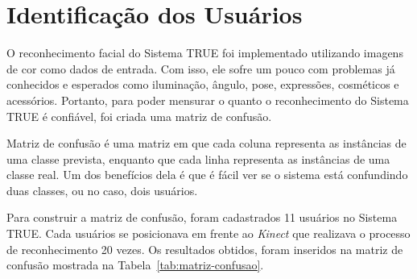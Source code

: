 \section{Identificação dos Usuários}
	 
	O reconhecimento facial do Sistema TRUE foi implementado utilizando imagens de cor como dados de entrada. Com isso, ele sofre um pouco com problemas já conhecidos e esperados como iluminação, ângulo, pose, expressões, cosméticos e acessórios. Portanto, para poder mensurar o quanto o reconhecimento do Sistema TRUE é confiável, foi criada uma matriz de confusão.

	Matriz de confusão é uma matriz em que cada coluna representa as instâncias de uma classe prevista, enquanto que cada linha representa as instâncias de uma classe real. Um dos benefícios dela é que é fácil ver se o sistema está confundindo duas classes, ou no caso, dois usuários.

	Para construir a matriz de confusão, foram cadastrados 11 usuários no Sistema
	TRUE. Cada usuários se posicionava em frente ao \textit{Kinect} que realizava
	o processo de reconhecimento 20 vezes. Os resultados obtidos, foram inseridos
	na matriz de confusão mostrada na Tabela~\ref{tab:matriz-confusao}.
	
